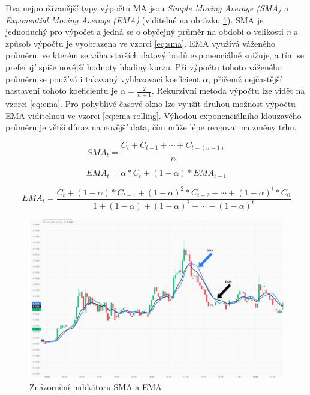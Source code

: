 Dva nejpoužívanější typy výpočtu MA jsou \emph{Simple Moving Average (SMA)} a \emph{Exponential Moving Average (EMA)} (viditelné na obrázku \ref{fig:ma-sma-ema}).
SMA je jednoduchý pro výpočet a jedná se o obyčejný průměr na období
o velikosti \emph{n} a způsob výpočtu je vyobrazena ve vzorci \ref{eq:sma}. EMA využívá váženého průměru, ve kterém se váha starších datový bodů exponenciálně snižuje, a tím se preferují spíše novější hodnoty hladiny kurzu.
Při výpočtu tohoto váženého průměru se používá i takzvaný vyhlazovací koeficient $\alpha$, přičemž nejčastější nastavení tohoto koeficientu je $ \alpha = \frac{2}{n+1}$.
Rekurzivní metoda výpočtu lze vidět na vzorci \ref{eq:ema}. Pro pohyblivé časové okno lze využít druhou možnost výpočtu EMA viditelnou ve vzorci \ref{eq:ema-rolling}.
Výhodou exponenciálního klouzavého průměru je větší důraz na novější data, čím může lépe reagovat na změny trhu.

\begin{equation}
    SMA_t = \frac{C_t + C_{t - 1} + \cdots + C_{t - (n - 1)}}{n}
    \label{eq:sma}
\end{equation}

\begin{equation}
    EMA_t = \alpha * C_t + (1 - \alpha) * EMA_{t - 1}
    \label{eq:ema}
\end{equation}

\begin{equation}
    EMA_t = \frac{C_t + (1 - \alpha) * C_{t-1} + (1 - \alpha)^2 * C_{t-2} + \cdots + (1 - \alpha)^t * C_0}{1 + (1 - \alpha) + (1 - \alpha)^2 + \cdots + (1 - \alpha)^t}
    \label{eq:ema-rolling}
\end{equation}

\begin{figure}[h]
    \centering
    \includegraphics[width=1\textwidth]{Figures/MA.pdf}
    \caption{Znázornění indikátoru SMA a EMA}
    \label{fig:ma-sma-ema}
\end{figure}

